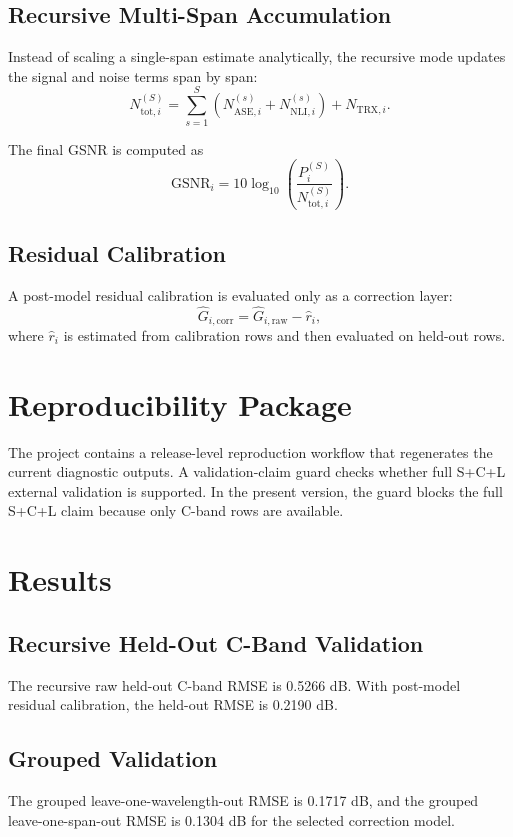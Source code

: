 \documentclass[twocolumn]{article}
\begin{document}
\subsection{Recursive Multi-Span Accumulation}
Instead of scaling a single-span estimate analytically, the recursive mode updates the signal and noise terms span by span:
\begin{equation}
N_{\mathrm{tot},i}^{(S)}
=
\sum_{s=1}^{S}
\left(
N_{\mathrm{ASE},i}^{(s)}
+
N_{\mathrm{NLI},i}^{(s)}
\right)
+
N_{\mathrm{TRX},i}.
\end{equation}

The final GSNR is computed as
\begin{equation}
\mathrm{GSNR}_i
=
10\log_{10}
\left(
\frac{P_i^{(S)}}{N_{\mathrm{tot},i}^{(S)}}
\right).
\end{equation}

\subsection{Residual Calibration}
A post-model residual calibration is evaluated only as a correction layer:
\begin{equation}
\hat{G}_{i,\mathrm{corr}}
=
\hat{G}_{i,\mathrm{raw}} - \hat{r}_i,
\end{equation}
where \(\hat{r}_i\) is estimated from calibration rows and then evaluated on held-out rows.

\section{Reproducibility Package}
The project contains a release-level reproduction workflow that regenerates the current diagnostic outputs. A validation-claim guard checks whether full S+C+L external validation is supported. In the present version, the guard blocks the full S+C+L claim because only C-band rows are available.

\section{Results}

\subsection{Recursive Held-Out C-Band Validation}
The recursive raw held-out C-band RMSE is 0.5266 dB. With post-model residual calibration, the held-out RMSE is 0.2190 dB.

\subsection{Grouped Validation}
The grouped leave-one-wavelength-out RMSE is 0.1717 dB, and the grouped leave-one-span-out RMSE is 0.1304 dB for the selected correction model.
\end{document}
